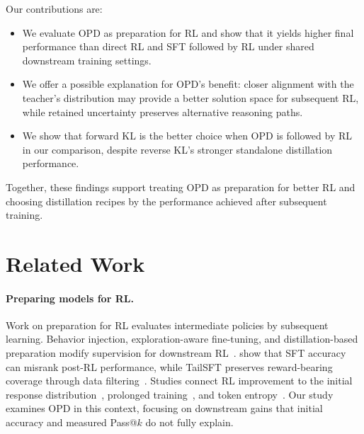 \documentclass[]{jingdong}
\theoremstyle{plain}
\theoremstyle{definition}
\theoremstyle{remark}
\begin{document}
\noindent Our contributions are:
\begin{itemize}
    \item We evaluate OPD as preparation for RL and show that it yields higher final performance than direct RL and SFT followed by RL under shared downstream training settings.
    \item We offer a possible explanation for OPD's benefit: closer alignment with the teacher's distribution may provide a better solution space for subsequent RL, while retained uncertainty preserves alternative reasoning paths.
    \item We show that forward KL is the better choice when OPD is followed by RL in our comparison, despite reverse KL's stronger standalone distillation performance.
\end{itemize}

Together, these findings support treating OPD as preparation for better RL and choosing distillation recipes by the performance achieved after subsequent training.

\section{Related Work}
\label{sec:related}
\paragraph{Preparing models for RL.}
Work on preparation for RL evaluates intermediate policies by subsequent learning. Behavior injection, exploration-aware fine-tuning, and distillation-based preparation modify supervision for downstream RL~\citep{cen2025behavior,mu2026oxa,li2026sequential}. \citet{kang2025quagmires} show that SFT accuracy can misrank post-RL performance, while TailSFT preserves reward-bearing coverage through data filtering~\citep{malladi2026tailsft}. Studies connect RL improvement to the initial response distribution~\citep{yue2025rlcapacity,wu2025invisible}, prolonged training~\citep{liu2025prorl}, and token entropy~\citep{wang2025entropy}. Our study examines OPD in this context, focusing on downstream gains that initial accuracy and measured Pass@$k$ do not fully explain.
\end{document}
